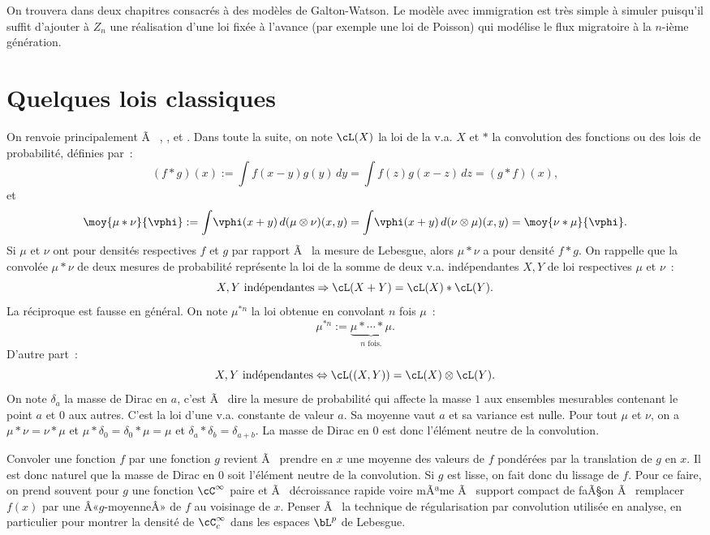 {{On trouvera dans \cite{ruget} deux chapitres consacrés à des modèles
de Galton-Watson. Le modèle avec immigration est très simple à simuler
puisqu'il suffit d'ajouter à $Z_n$ une réalisation d'une loi fixée à
l'avance (par exemple une loi de Poisson) qui modélise le flux
migratoire à la $n$-ième génération.

%
%
\chapter{Quelques lois classiques}
%
%

On renvoie principalement Ã  \cite{borkar}, \cite{rudin}, \cite{bouleau} et
\cite{dacunha-castelle-duflo}. Dans toute la suite, on note $\cL(X)$ la loi de
la v.a. $X$ et $*$ la convolution des fonctions ou des lois de probabilité,
définies par~:
$$
(f*g)(x):=\int\!f(x-y)g(y)\,dy=\int\!f(z)g(x-z)\,dz=(g*f)(x),
$$
et
$$
\moy{\mu*\nu}{\vphi} :=\int\!\vphi(x+y)\,d(\mu\otimes\nu)(x,y)
=\int\!\vphi(x+y)\,d(\nu\otimes\mu)(x,y)=\moy{\nu*\mu}{\vphi}.
$$
Si $\mu$ et $\nu$ ont pour densités respectives $f$ et $g$ par rapport Ã  la
mesure de Lebesgue, alors $\mu*\nu$ a pour densité $f*g$. On rappelle que la
convolée $\mu*\nu$ de deux mesures de probabilité représente la loi de la
somme de deux v.a. indépendantes $X,Y$ de loi respectives $\mu$ et $\nu$~:
$$
X,Y \text{ indépendantes} \Rightarrow \cL(X+Y)=\cL(X) * \cL(Y).
$$
La réciproque est fausse en général. On note $\mu^{*n}$ la loi obtenue en
convolant $n$ fois $\mu$~:
$$
\mu^{*n}:=\underbrace{\mu* \cdots * \mu}_{n \text{ fois.}}.
$$
D'autre part~:
$$
X,Y \text{ indépendantes} \Leftrightarrow \cL((X,Y))=\cL(X)\otimes\cL(Y).
$$
On note $\delta_a$ la masse de Dirac en $a$, c'est Ã  dire la mesure de
probabilité qui affecte la masse $1$ aux ensembles mesurables contenant le
point $a$ et $0$ aux autres. C'est la loi d'une v.a. constante de valeur $a$.
Sa moyenne vaut $a$ et sa variance est nulle. Pour tout $\mu$ et $\nu$, on a
$\mu*\nu=\nu*\mu$ et $\mu*\delta_0=\delta_0*\mu=\mu$ et $\delta_a*\delta_b=\delta_{a+b}$. La
masse de Dirac en $0$ est donc l'élément neutre de la convolution.

\begin{eur}[Convolution = lissage]
  Convoler une fonction $f$ par une fonction $g$ revient Ã  prendre en $x$ une
  moyenne des valeurs de $f$ pondérées par la translation de $g$ en $x$. Il
  est donc naturel que la masse de Dirac en $0$ soit l'élément neutre de la
  convolution. Si $g$ est lisse, on fait donc du lissage de $f$. Pour ce
  faire, on prend souvent pour $g$ une fonction $\cC^\infty$ paire et Ã 
  décroissance rapide voire mÃªme Ã  support compact de faÃ§on Ã  remplacer $f(x)$
  par une Â«$g$-moyenneÂ» de $f$ au voisinage de $x$.  Penser Ã  la technique de
  régularisation par convolution utilisée en analyse, en particulier pour
  montrer la densité de $\cC^\infty_c$ dans les espaces $\bL^p$ de Lebesgue.
\end{eur}

}}
